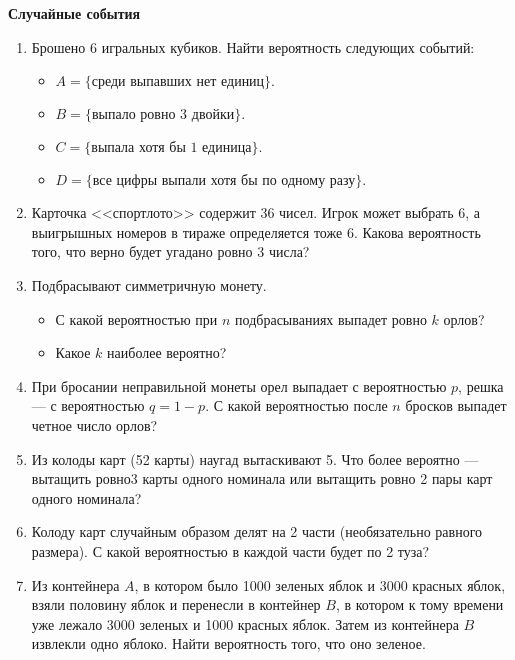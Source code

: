 \documentclass{article}
\begin{document}
\large
	
\begin{center}
	\textbf{Случайные события}
\end{center}


\begin{enumerate}[label*=\protect\fbox{\arabic{enumi}}]
	
\item Брошено 6 игральных кубиков. Найти вероятность следующих событий:
\begin{itemize}
	\item $A= \{\text{среди выпавших нет единиц}\}.$
	\item $B= \{\text{выпало ровно 3 двойки}\}.$
	\item $C= \{\text{выпала хотя бы 1 единица}\}.$
	\item $D= \{\text{все цифры выпали хотя бы по одному разу}\}.$
\end{itemize}

\item Карточка <<спортлото>> содержит 36 чисел. Игрок может выбрать 6, а выигрышных номеров в тираже определяется тоже 6. Какова вероятность того, что верно будет угадано ровно 3 числа?

\item Подбрасывают симметричную монету.
\begin{itemize}
	\item С какой вероятностью при $n$ подбрасываниях выпадет ровно $k$ орлов?
	\item Какое $k$ наиболее вероятно?
\end{itemize}

\item  При бросании неправильной монеты орел выпадает с вероятностью $p$, решка — с вероятностью $q=  1-p$. С какой вероятностью после $n$ бросков выпадет четное число орлов?

\item Из колоды карт (52 карты) наугад вытаскивают 5. Что более вероятно — вытащить ровно3 карты одного номинала или вытащить ровно 2 пары карт одного номинала?

\item Колоду карт случайным образом делят на 2 части (необязательно равного размера). С какой вероятностью в каждой части будет по 2 туза?

\item Из контейнера $A$, в котором было 1000 зеленых яблок и 3000 красных яблок, взяли половину яблок и перенесли в контейнер $B$, в котором к тому времени уже лежало 3000 зеленых и 1000 красных яблок. Затем из контейнера $B$ извлекли одно яблоко. Найти вероятность того, что оно зеленое.


\end{enumerate}
\end{document}
